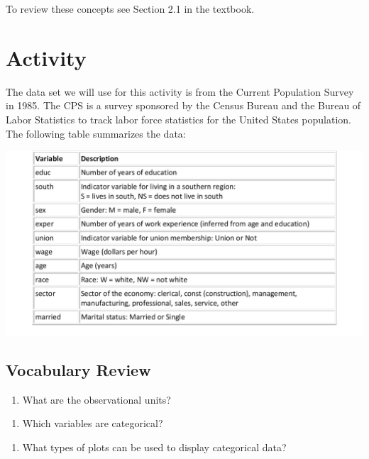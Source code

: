\documentclass[
]{report}
\providecommand{\tightlist}{%
  \setlength{\itemsep}{0pt}\setlength{\parskip}{0pt}}
\begin{document}
To review these concepts see Section 2.1 in the textbook.

\newpage

\hypertarget{activity-1}{%
\section{Activity}\label{activity-1}}

The data set we will use for this activity is from the Current Population Survey in 1985. The CPS is a survey sponsored by the Census Bureau and the Bureau of Labor Statistics to track labor force statistics for the United States population. The following table summarizes the data:

\begin{center}\includegraphics[width=0.7\linewidth]{images/cps} \end{center}

\hypertarget{vocabulary-review}{%
\subsection{Vocabulary Review}\label{vocabulary-review}}

\begin{enumerate}
\def\labelenumi{\arabic{enumi}.}
\tightlist
\item
  What are the observational units?
\end{enumerate}

\vspace{0.5in}

\begin{enumerate}
\def\labelenumi{\arabic{enumi}.}
\setcounter{enumi}{1}
\tightlist
\item
  Which variables are categorical?
\end{enumerate}

\vspace{0.5in}

\begin{enumerate}
\def\labelenumi{\arabic{enumi}.}
\setcounter{enumi}{2}
\tightlist
\item
  What types of plots can be used to display categorical data?
\end{enumerate}
\end{document}
